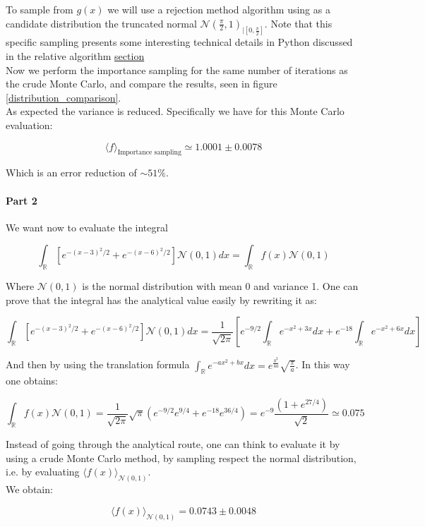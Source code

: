 To sample from $g(x)$ we will use a rejection method algorithm using as a candidate distribution the truncated normal $\mathcal{N}(\frac{\pi}{2}, 1)_{\mid [0, \frac{\pi}{2}]}$. 
Note that this specific sampling presents some interesting technical details in Python discussed in the relative algorithm \hyperref[par:detail_rejection]{section} \\
Now we perform the importance sampling for the same number of iterations as the crude Monte Carlo, and compare the results, seen in figure \ref{distribution_comparison}. \\
As expected the variance is reduced. Specifically we have for this Monte Carlo evaluation:

$$ \langle f \rangle_{\text{Importance sampling}} \simeq 1.0001 \pm 0.0078 $$

Which is an error reduction of $\sim 51 \%$.

\paragraph*{Part 2} We want now to evaluate the integral


$$\int_{\mathbb{R}}\left[ e^{-(x-3)^2/2}+e^{-(x-6)^2/2} \right] \mathcal{N}(0,1) dx = \int_{\mathbb{R}} f(x) \mathcal{N}(0,1) $$

Where $\mathcal{N}(0,1)$ is the normal distribution with mean 0 and variance 1.
One can prove that the integral has the analytical value easily by rewriting it as:

$$ \int_{\mathbb{R}}\left[ e^{-(x-3)^2/2}+e^{-(x-6)^2/2} \right] \mathcal{N}(0,1) dx = \frac{1}{\sqrt{2\pi}} \left[ e^{-9/2}\int_{\mathbb{R}}e^{-x^2+3x} dx + e^{-18}\int_{\mathbb{R}}e^{-x^2+6x} dx \right] $$

And then by using the translation formula $\int_{\mathbb{R}} e^{-ax^2+bx} dx = e^{\frac{b^2}{4a}} \sqrt{\frac{\pi}{a}}$. In this way one obtains:

$$ \int_{\mathbb{R}} f(x) \mathcal{N}(0,1) = \frac{1}{\sqrt{2 \pi }} \sqrt{\pi} \left( e^{-9/2}e^{9/4} + e^{-18}e^{36/4}  \right) = e^{-9}\frac{(1 + e^{27/4})}{\sqrt{2}} \simeq 0.075$$

Instead of going through the analytical route, one can think to evaluate it by using a crude Monte Carlo method, by sampling respect the normal distribution, 
i.e. by evaluating $\langle f(x) \rangle_{\mathcal{N}(0,1)}$. \\
We obtain:

$$ \langle f(x) \rangle_{\mathcal{N}(0,1)} = 0.0743 \pm 0.0048 $$


